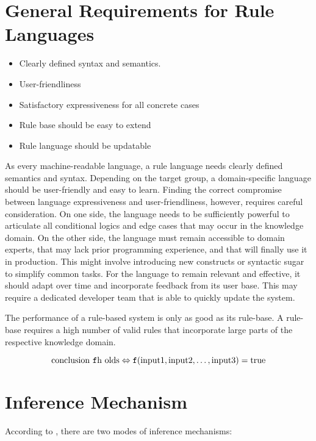 \section{General Requirements for Rule Languages}\label{sec:general-rule-language-requirements}

\begin{itemize}
    \item Clearly defined syntax and semantics.
    \item User-friendliness
    \item Satisfactory expressiveness for all concrete cases
    \item Rule base should be easy to extend
    \item Rule language should be updatable
\end{itemize}

As every machine-readable language, a rule language needs clearly defined semantics and syntax.
Depending on the target group, a domain-specific language should be user-friendly and easy to learn.
Finding the correct compromise between language expressiveness and user-friendliness\cite{https://doi.org/10.1002/widm.11},
however, requires careful consideration.
On one side, the language needs
to be sufficiently powerful to articulate all conditional logics and edge cases that may occur in the knowledge domain.
On the other side, the language must remain accessible to domain experts,
that may lack prior programming experience, and that will finally use it in production.
This might involve introducing new constructs or syntactic sugar to simplify common tasks.
For the language to remain relevant and effective, it should adapt over time and incorporate feedback from its user base.
This may require a dedicated developer team that is able to quickly update the system.

The performance of a rule-based system is only as good as its rule-base. 
A rule-base requires a high number of valid rules that incorporate large parts of the respective knowledge domain.

\[
    \text{conclusion \texttt{f}h olds} \Leftrightarrow \texttt{f}(\text{input1}, \text{input2}, \ldots, \text{input3}) = \text{true}
\]

\section{Inference Mechanism}\label{sec:inference-mechanism}

According to \cite{https://doi.org/10.1002/widm.11}, there are two modes of inference mechanisms:

